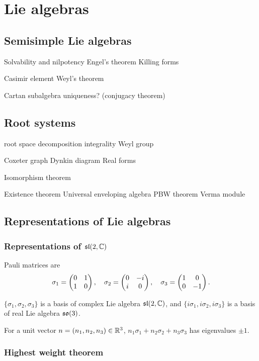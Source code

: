 \documentclass{../../large}
\begin{document}
\part{Lie algebras}
\chapter{Semisimple Lie algebras}
Solvability and nilpotency
Engel's theorem
Killing forms

Casimir element
Weyl's theorem

Cartan subalgebra uniqueness? (conjugacy theorem)




\chapter{Root systems}
root space decomposition
integrality
Weyl group

Coxeter graph
Dynkin diagram
Real forms

Isomorphism theorem

Existence theorem
Universal enveloping algebra
PBW theorem
Verma module




\chapter{Representations of Lie algebras}
\section{Representations of $\mathfrak{sl}(2,\mathbb{C})$}
\begin{prb}
Pauli matrices are
\[\sigma_1=\begin{pmatrix}0&1\\1&0\end{pmatrix},\quad\sigma_2=\begin{pmatrix}0&-i\\i&0\end{pmatrix},\quad\sigma_3=\begin{pmatrix}1&0\\0&-1\end{pmatrix}.\]
\begin{parts}
\item $\{\sigma_1,\sigma_2,\sigma_3\}$ is a basis of complex Lie algebra $\mathfrak{sl}(2,\mathbb{C})$, and $\{i\sigma_1,i\sigma_2,i\sigma_3\}$ is a basis of real Lie algebra $\mathfrak{so}(3)$.
\item For a unit vector $n=(n_1,n_2,n_3)\in\mathbb{R}^3$, $n_1\sigma_1+n_2\sigma_2+n_3\sigma_3$ has eigenvalues $\pm1$.
\end{parts}
\end{prb}
\section{Highest weight theorem}
\end{document}
